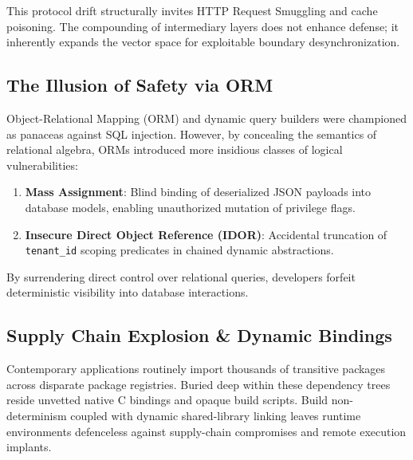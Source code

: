 \documentclass[10pt,a4paper,twocolumn]{article}
\newif\ifja
\begin{document}
This protocol drift structurally invites HTTP Request Smuggling and cache poisoning. The compounding of intermediary layers does not enhance defense; it inherently expands the vector space for exploitable boundary desynchronization.
\fi

\subsection{
\ifja ORMによる偽りの安全性 \else The Illusion of Safety via ORM \fi
}
\ifja
オブジェクト関係マッピング（ORM）や抽象クエリビルダは、SQLインジェクションを自明に防御する銀の弾丸として普及した。しかし、ORMが隠蔽したリレーショナル代数のセマンティクスは、より致命的な論理欠陥を胚胎させた。
\begin{enumerate}
    \item \textbf{Mass Assignment}: デシリアライズされた入力ペイロードを内部モデルへ無検証にバインドすることによる、管理者フラグや権限属性の改ざん。
    \item \textbf{Insecure Direct Object Reference (IDOR)}: 動的クエリビルダのメソッドチェーンにおける、マルチテナント境界（\texttt{tenant\_id}）フィルタの意図しない脱落。
\end{enumerate}
生のリレーショナル代数を直接記述することを放棄した結果、プログラマは自らが発行するクエリの決定論性を喪失している。
\else
Object-Relational Mapping (ORM) and dynamic query builders were championed as panaceas against SQL injection. However, by concealing the semantics of relational algebra, ORMs introduced more insidious classes of logical vulnerabilities:
\begin{enumerate}
    \item \textbf{Mass Assignment}: Blind binding of deserialized JSON payloads into database models, enabling unauthorized mutation of privilege flags.
    \item \textbf{Insecure Direct Object Reference (IDOR)}: Accidental truncation of \texttt{tenant\_id} scoping predicates in chained dynamic abstractions.
\end{enumerate}
By surrendering direct control over relational queries, developers forfeit deterministic visibility into database interactions.
\fi

\subsection{
\ifja サプライチェーンの爆発と動的バインディング \else Supply Chain Explosion \& Dynamic Bindings \fi
}
\ifja
一般的なモダンアプリケーションは、直接的・間接的に膨大な外部パッケージに依存している。各依存パッケージの深層には、検証されていない動的C拡張や不可逆なビルド時スクリプトが存在する。ビルドの非決定論性とランタイムの動的リンクは、ソフトウェアサプライチェーン攻撃に対する完全な無防備状態を作り出している。
\else
Contemporary applications routinely import thousands of transitive packages across disparate package registries. Buried deep within these dependency trees reside unvetted native C bindings and opaque build scripts. Build non-determinism coupled with dynamic shared-library linking leaves runtime environments defenceless against supply-chain compromises and remote execution implants.
\fi
\end{document}
